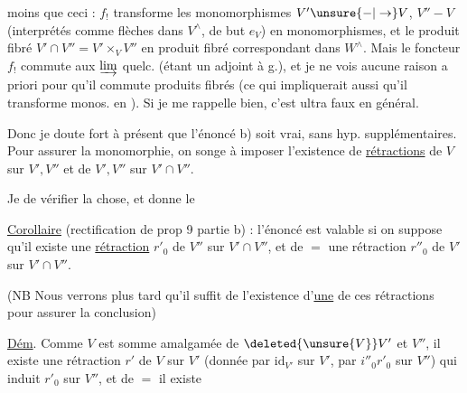 
moins que ceci : $f_!$ transforme les monomorphismes $V'\unsure{-|\to}V$, $V''\mathbin{-}V$ (interprétés comme flèches dans $V^\wedge$, de but $e_V$) en monomorphismes, et le produit fibré $V'\cap V''=V'\times_V V''$ en  produit fibré correspondant dans $W^\wedge$. Mais le foncteur $f_!$ commute aux $\varinjlim$ quelc. (étant un adjoint à g.), et je ne vois aucune raison a priori pour qu'il  commute   produits fibrés (ce qui impliquerait aussi qu'il transforme monos. en ). Si je me rappelle bien, c'est ultra faux en général.

Donc je doute fort à présent que l'énoncé b) soit vrai, sans hyp. supplémentaires. Pour assurer la monomorphie, on songe à imposer l'existence de \uline{rétractions} de $V$ sur $V',V''$ et de $V',V''$ sur $V'\cap V''$.

Je  de vérifier la chose, et donne le

\uline{Corollaire} (rectification de prop 9 partie b) : l'énoncé est valable si on suppose  qu'il existe une \uline{rétraction} $r'_0$ de $V''$ sur $V'\cap V''$, et de $=$ une rétraction $r''_0$ de $V'$ sur $V'\cap V''$.



(NB Nous verrons plus tard qu'il suffit de l'existence d'\uline{une} de ces rétractions pour assurer la conclusion)


\uline{Dém}. Comme $V$ est somme amalgamée de $\deleted{\unsure{V}}V'$ et $V''$,  il existe une rétraction $r'$ de $V$ sur $V'$ (donnée par $\mathrm{id}_{V'}$ sur $V'$, par $i''_0r'_0$ sur $V''$) qui induit $r'_0$ sur $V''$, et de $=$ il existe
